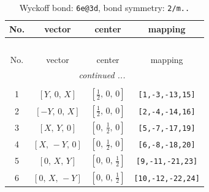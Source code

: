\documentclass[fleqn,8pt]{jsarticle}
\begin{document}
\renewcommand{\arraystretch}{1.2}
\begin{longtable}{cccc}
\caption{Wyckoff bond: {\tt 6e@3d}, bond symmetry: {\tt 2/m..}}
 \\
 \hline \hline
No. & vector & center & mapping \\ \hline \endfirsthead

\multicolumn{3}{l}{\tablename\ \thetable{}} \\
 \hline \hline
No. & vector & center & mapping \\ \hline \endhead

 \hline \hline
\multicolumn{3}{r}{\footnotesize\it continued ...} \\ \endfoot

 \hline \hline
\multicolumn{3}{r}{} \\ \endlastfoot

1 & $\left[ Y,\, 0,\, X \right]$ & $\left[ \frac{1}{2},\, 0,\, 0 \right]$ & {\tt [1,-3,-13,15]} \\ \hline
2 & $\left[ - Y,\, 0,\, X \right]$ & $\left[ \frac{1}{2},\, 0,\, 0 \right]$ & {\tt [2,-4,-14,16]} \\ \hline
3 & $\left[ X,\, Y,\, 0 \right]$ & $\left[ 0,\, \frac{1}{2},\, 0 \right]$ & {\tt [5,-7,-17,19]} \\ \hline
4 & $\left[ X,\, - Y,\, 0 \right]$ & $\left[ 0,\, \frac{1}{2},\, 0 \right]$ & {\tt [6,-8,-18,20]} \\ \hline
5 & $\left[ 0,\, X,\, Y \right]$ & $\left[ 0,\, 0,\, \frac{1}{2} \right]$ & {\tt [9,-11,-21,23]} \\ \hline
6 & $\left[ 0,\, X,\, - Y \right]$ & $\left[ 0,\, 0,\, \frac{1}{2} \right]$ & {\tt [10,-12,-22,24]} \\
\end{longtable}
\renewcommand{\arraystretch}{1.2}
\end{document}
